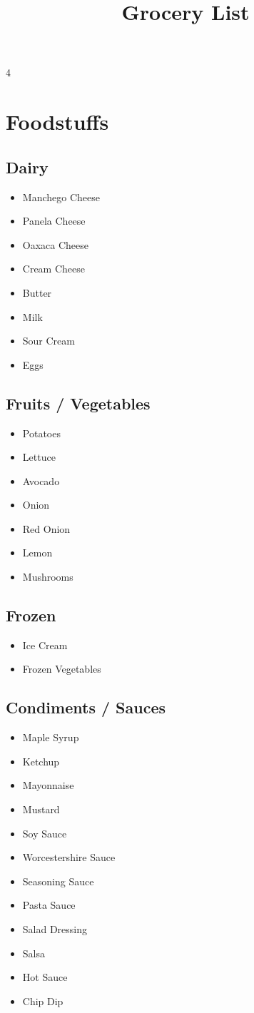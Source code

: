 \documentclass[10pt,letterpaper]{article}
\title{\vspace{-5ex}Grocery List\vspace{-5ex}}
\author{}
\date{}
\newcommand{\get}{\item[\Square]}
\begin{document}

\begin{multicols*}{4} %
\maketitle
\section*{Foodstuffs}

\subsection*{Dairy}
\begin{itemize}
\get Manchego Cheese
\get Panela Cheese
\get Oaxaca Cheese
\get Cream Cheese
\get Butter
\get Milk
\get Sour Cream
\get Eggs
\end{itemize}

\subsection*{Fruits / Vegetables}
\begin{itemize}
\get Potatoes
\get Lettuce
\get Avocado
\get Onion
\get Red Onion
\get Lemon
\get Mushrooms
\end{itemize}

\subsection*{Frozen}
\begin{itemize}
\get Ice Cream
\get Frozen Vegetables
\end{itemize}

\subsection*{Condiments / Sauces}
\begin{itemize}
\get Maple Syrup
\get Ketchup
\get Mayonnaise
\get Mustard
\get Soy Sauce
\get Worcestershire Sauce
\get Seasoning Sauce
\get Pasta Sauce
\get Salad Dressing
\get Salsa
\get Hot Sauce
\get Chip Dip
\end{itemize}


\end{multicols*}
\end{document}
